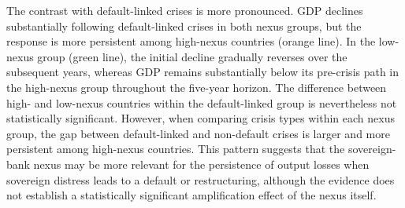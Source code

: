 \documentclass[12pt]{article}
\newcommand{\notes}[1]{\par\begingroup\footnotesize\itshape\justifying\noindent Notes: #1\par\endgroup}
\begin{document}
%
%

The contrast with default-linked crises is more pronounced. GDP declines
substantially following default-linked crises in both nexus groups, but
the response is more persistent among high-nexus countries (orange line).
In the low-nexus group (green line), the initial decline gradually
reverses over the subsequent years, whereas GDP remains substantially
below its pre-crisis path in the high-nexus group throughout the
five-year horizon. The difference between high- and low-nexus countries
within the default-linked group is nevertheless not statistically
significant. However, when comparing crisis types within each nexus
group, the gap between default-linked and non-default crises is larger
and more persistent among high-nexus countries. This pattern suggests
that the sovereign-bank nexus may be more relevant for the persistence of
output losses when sovereign distress leads to a default or
restructuring, although the evidence does not establish a statistically
significant amplification effect of the nexus itself.
\end{document}
